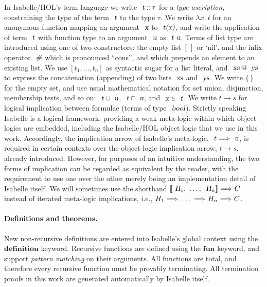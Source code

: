\documentclass[11pt]{article}
\begin{document}
In Isabelle/HOL's term language we write $\isa{t} \mathbin{::} \tau$ for a \emph{type ascription}, constraining the type of the term $\isa{t}$ to the type $\tau$.
We write $\lambda{x}.\: t$ for an anonymous function mapping an argument $\isa{x}$ to $\isa{t(x)}$, and write the application of term $\isa{t}$ with function type to an argument $\isa{u}$ as $\isa{t\ u}$.
Terms of list type are introduced using one of two constructors: the empty list $[\,]$ or `nil', and the infix operator $\isa{\#}$ which is pronounced ``cons'', and which prepends an element to an existing list.
We use $[t_1, \ldots, t_n]$ as syntactic sugar for a list literal, and $\isa{xs} \mathbin{\isacharat} \isa{ys}$ to express the concatenation (appending) of two lists $\isa{xs}$ and $\isa{ys}$.
We write $\{\,\}$ for the empty set, and use usual mathematical notation for set union, disjunction, membership tests, and so on: $\isa{t} \cup \isa{u}$, $\isa{t} \cap \isa{u}$, and $\isa{x} \in \isa{t}$.
We write $t \longrightarrow s$ for logical implication between formulae (terms of type $\isa{bool}$).
Strictly speaking Isabelle is a logical framework, providing a weak meta-logic within which object logics are embedded, including the Isabelle/HOL object logic that we use in this work.
Accordingly, the implication arrow of Isabelle's meta-logic, $\isa{t} \Longrightarrow \isa{u}$, is required in certain contexts over the object-logic implication arrow, $t \longrightarrow s$, already introduced.
However, for purposes of an intuitive understanding, the two forms of implication can be regarded as equivalent by the reader, with the requirement to use one over the other merely being an implementation detail of Isabelle itself.
We will sometimes use the shorthand ${\isasymlbrakk}\isa{H}_1{\isacharsemicolon}\ \ldots{\isacharsemicolon}\ \isa{H}_n{\isasymrbrakk}\ {\isasymLongrightarrow}\ C$ instead of iterated meta-logic implications, i.e., $H_1\ {\isasymLongrightarrow}\ \ldots\ {\isasymLongrightarrow}\ H_n\ {\isasymLongrightarrow}\ C$.

\paragraph{Definitions and theorems.}

New non-recursive definitions are entered into Isabelle's global context using the $\mathbf{definition}$ keyword.
Recursive functions are defined using the $\mathbf{fun}$ keyword, and support \emph{pattern matching} on their arguments.
All functions are total, and therefore every recursive function must be provably terminating.
All termination proofs in this work are generated automatically by Isabelle itself.
\end{document}
